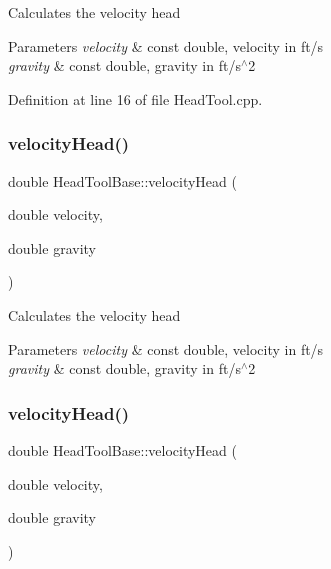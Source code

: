 Calculates the velocity head 
\begin{DoxyParams}{Parameters}
{\em velocity} & const double, velocity in ft/s \\
\hline
{\em gravity} & const double, gravity in ft/s$^\wedge$2 \\
\hline
\end{DoxyParams}


Definition at line 16 of file Head\+Tool.\+cpp.

\mbox{\label{class_head_tool_base_a461c3d53a92763ca08c9a5bbcbef83c3}} 
\subsubsection{\texorpdfstring{velocity\+Head()}{velocityHead()}\hspace{0.1cm}{\footnotesize\ttfamily [2/3]}}
{\footnotesize\ttfamily double Head\+Tool\+Base\+::velocity\+Head (\begin{DoxyParamCaption}\item[{double}]{velocity,  }\item[{double}]{gravity }\end{DoxyParamCaption})\hspace{0.3cm}{\ttfamily [protected]}}

Calculates the velocity head 
\begin{DoxyParams}{Parameters}
{\em velocity} & const double, velocity in ft/s \\
\hline
{\em gravity} & const double, gravity in ft/s$^\wedge$2 \\
\hline
\end{DoxyParams}
\mbox{\label{class_head_tool_base_a461c3d53a92763ca08c9a5bbcbef83c3}} 
\subsubsection{\texorpdfstring{velocity\+Head()}{velocityHead()}\hspace{0.1cm}{\footnotesize\ttfamily [3/3]}}
{\footnotesize\ttfamily double Head\+Tool\+Base\+::velocity\+Head (\begin{DoxyParamCaption}\item[{double}]{velocity,  }\item[{double}]{gravity }\end{DoxyParamCaption})\hspace{0.3cm}{\ttfamily [protected]}}

